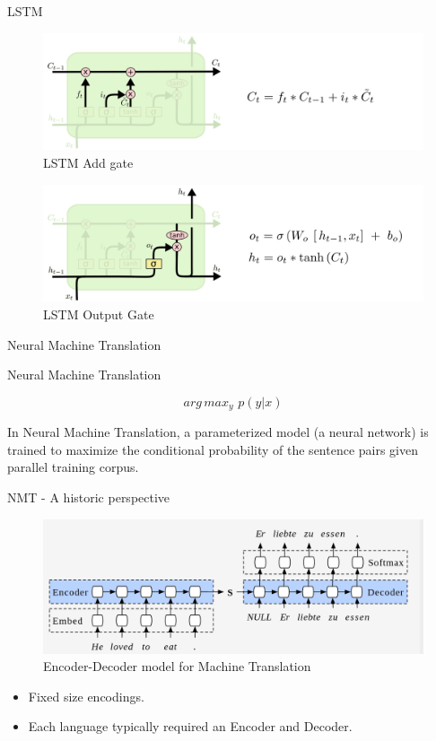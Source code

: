 ﻿\documentclass[table,aspectratio=43,mathserif,xcolor={usenames,dvipsnames,svgnames,table},10pt]{beamer}
\begin{document}
\begin{frame}{LSTM}
 \begin{figure}[h]
    \includegraphics[width=0.6\linewidth]{images/lstm_add1.png}  
    \caption{LSTM Add gate}
  \end{figure}
   \begin{figure}[h]
    \includegraphics[width=0.6\linewidth]{images/lstm_output.png}  
    \caption{LSTM Output Gate}
  \end{figure}
\end{frame}


\begin{section}{Neural Machine Translation}
\end{section}

\begin{frame}{Neural Machine Translation}

$$ arg\,max _{y}  \,\, p(y|x)$$
 
 
In Neural Machine Translation, a parameterized model (a neural network) is trained to maximize the conditional probability of the sentence pairs given parallel training corpus.
\end{frame}

\begin{frame}{NMT - A historic perspective}
  \begin{figure}[h]
    \includegraphics[width=0.9\linewidth]{images/enc_dec.png}  
    \caption{Encoder-Decoder model for Machine Translation}
  \end{figure}
\begin{itemize}
 \item<+-> Fixed size encodings.
 \item<+-> Each language typically required an Encoder and Decoder.
\end{itemize}
\end{frame}
\end{document}
